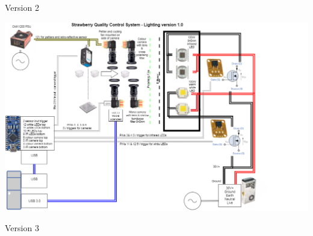 \documentclass[fleqn,twoside,12pt]{report}
\begin{document}
\newpage
Version 2
\begin{minipage}[b]{0.9\linewidth}
	\includegraphics[scale=0.9,angle=270]{appendix/wiring_2.png}
\end{minipage}




\newpage
Version 3
\begin{minipage}[b]{0.9\linewidth}
	
\end{minipage}







\end{document}
